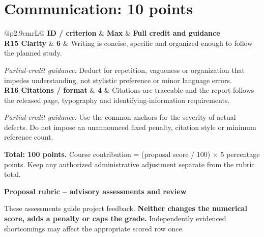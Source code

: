\documentclass{article}
\newcommand{\criterion}[4]{\textbf{#1} & \textbf{#2} & #3\par\textit{Partial-credit guidance:} #4\\[5pt]}
\begin{document}
\section*{Communication: 10 points}
\noindent\begin{tabularx}{\linewidth}{@{}p{2.9cm}rL@{}}
\textbf{ID / criterion} & \textbf{Max} & \textbf{Full credit and guidance}\\\hline
\criterion{R15 Clarity}{6}{Writing is concise, specific and organized enough to follow the planned study.}{Deduct for repetition, vagueness or organization that impedes understanding, not stylistic preference or minor language errors.}
\criterion{R16 Citations / format}{4}{Citations are traceable and the report follows the released page, typography and identifying-information requirements.}{Use the common anchors for the severity of actual defects. Do not impose an unannounced fixed penalty, citation style or minimum reference count.}
\end{tabularx}
\noindent\textbf{Total: 100 points.} Course contribution = (proposal score / 100) $\times$ 5 percentage points. Keep any authorized administrative adjustment separate from the rubric total.

\newpage
\begin{center}{\large\bfseries Proposal rubric -- advisory assessments and review}\end{center}
\noindent These assessments guide project feedback. \textbf{Neither changes the numerical score, adds a penalty or caps the grade.} Independently evidenced shortcomings may affect the appropriate scored row once.
\end{document}
